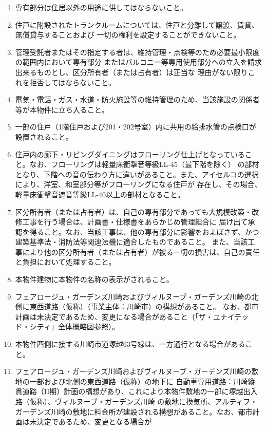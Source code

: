 \documentclass[
  twoside,
  luatex,
  paper=a4paper,
  fontsize=11pt,
  jafontsize=11pt,
  jlreq_notes,
]{jlreq}
\begin{document}
  \begin{enumerate}
  \item 専有部分は住居以外の用途に供してはならないこと。
  \item 住戸に附設されたトランクルームについては、住戸と分離して譲渡、賃貸、無償貸与することおよび
        一切の権利を設定することができないこと。
  \item 管理受託者またはその指定する者は、維持管理・点検等のため必要最小限度の範囲内において専有部分
        またはバルコニー等専用使用部分への立入を請求出来るものとし、区分所有者（または占有者）は正当な
        理由がない限りこれを拒否してはならないこと。
  \item 電気・電話・ガス・水道・防火施設等の維持管理のため、当該施設の関係者等が本物件に立ち入ること。
  \item 一部の住戸（1階住戸および201・202号室）内に共用の給排水管の点検口が設置されること。
  \item 住戸内の廊下・リビングダイニングはフローリング仕上げとなっていること。なお、フローリングは軽量床衝撃音等級LL-45（最下階を除く）
        の部材となり、下階への音の伝わり方に違いがあること。また、アイセルコの選択により、洋室、和室部分等がフローリングになる住戸が
        存在し、その場合、軽量床衝撃音遮音等級LL-40以上の部材となること。
  \item 区分所有者（または占有者）は、自己の専有部分であっても大規模改築・改修工事を行う場合は、計画書・仕様書をあらかじめ管理組合に
        届け出て承認を得ること。なお、当該工事は、他の専有部分に影響をおよぼさず、かつ建築基準法・消防法等関連法機に適合したものであること。
        また、当該工事により他の区分所有者（または占有者）が被る一切の損害は、自己の責任と負担において処理すること。
  \item 本物件建物に本物件の名称の表示がされること。
  \item フェアロージュ・ガーデンズ川崎およびヴィルヌーブ・ガーデンズ川崎の北側に東西道路（仮称）（事業主体：川崎市）の構想があること。
        なお、都市計画は未決定であるため、変更になる場合があること（「ザ・ユナイテッド・シティ」全体概略図参照）。
  \item 本物件西側に接する川崎市道塚越63号線は、一方通行となる場合があること。
  \item フェアロージュ・ガーデンズ川崎およびヴィルヌーブ・ガーデンズ川崎の敷地の一部および北側の東西道路（仮称）の地下に
        自動車専用道路：川崎縦貫道路（II期）計画の構想があり、これにより本物件敷地の一部に塚越出入路（仮称）、ヴィルヌーブ・ガーデンズ川崎
        の敷地に換気所、アルティフ・ガーデンズ川崎の敷地に料金所が建設される構想があること。なお、都市計画は未決定であるため、変更となる場合が

\end{enumerate}
\end{document}
